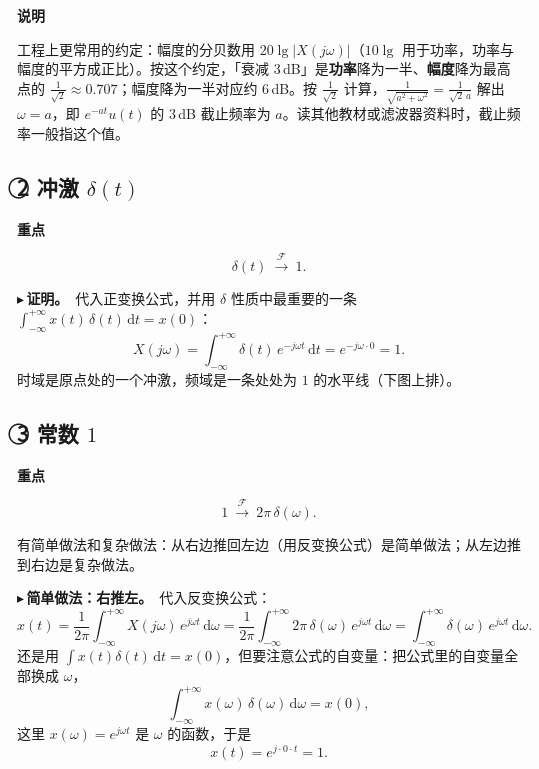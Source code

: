 \documentclass[UTF8,a4paper,11pt]{ctexart}
\newcommand{\dd}{\mathrm{d}}
\newcommand{\F}{\mathcal{F}}
\newenvironment{remember}{\begin{rememberbox}\textbf{重点}\par\smallskip}{\end{rememberbox}}
\newenvironment{note}{\begin{notebox}\textbf{说明}\par\smallskip}{\end{notebox}}
\newcounter{ex}[section]
\newcommand{\point}[1]{\par\addvspace{1ex}\noindent\textcolor{ptteal}{$\blacktriangleright$\,\textbf{#1}}\ }
\begin{document}
\begin{note}
工程上更常用的约定：幅度的分贝数用 $20\lg|X(j\omega)|$（$10\lg$ 用于功率，功率与幅度的平方成正比）。按这个约定，「衰减 3\,dB」是\textbf{功率}降为一半、\textbf{幅度}降为最高点的 $\frac1{\sqrt2}\approx0.707$；幅度降为一半对应约 $6$\,dB。按 $\frac1{\sqrt2}$ 计算，$\frac1{\sqrt{a^2+\omega^2}}=\frac1{\sqrt2\,a}$ 解出 $\omega=a$，即 $e^{-at}u(t)$ 的 3\,dB 截止频率为 $a$。读其他教材或滤波器资料时，截止频率一般指这个值。
\end{note}

\subsection{\texorpdfstring{\textcircled{\scriptsize 2} 冲激 $\delta(t)$}{② 冲激 δ(t)}}\label{sub:delta}
\begin{remember}
\[
\delta(t)\ \xrightarrow{\ \F\ }\ 1 .
\]
\end{remember}
\point{证明。}代入正变换公式，并用 $\delta$ 性质中最重要的一条 $\displaystyle\int_{-\infty}^{+\infty}x(t)\,\delta(t)\,\dd t=x(0)$：
\[
X(j\omega)=\int_{-\infty}^{+\infty}\delta(t)\,e^{-j\omega t}\,\dd t=e^{-j\omega\cdot0}=1 .
\]
时域是原点处的一个冲激，频域是一条处处为 $1$ 的水平线（下图上排）。

\subsection{\texorpdfstring{\textcircled{\scriptsize 3} 常数 $1$}{③ 常数 1}}\label{sub:one}
\begin{remember}
\[
1\ \xrightarrow{\ \F\ }\ 2\pi\,\delta(\omega).
\]
\end{remember}
有简单做法和复杂做法：从右边推回左边（用反变换公式）是简单做法；从左边推到右边是复杂做法。

\point{简单做法：右推左。}代入反变换公式：
\[
x(t)=\frac1{2\pi}\int_{-\infty}^{+\infty}X(j\omega)\,e^{j\omega t}\,\dd\omega
=\frac1{2\pi}\int_{-\infty}^{+\infty}2\pi\,\delta(\omega)\,e^{j\omega t}\,\dd\omega
=\int_{-\infty}^{+\infty}\delta(\omega)\,e^{j\omega t}\,\dd\omega .
\]
还是用 $\int x(t)\delta(t)\,\dd t=x(0)$，但要注意公式的自变量：把公式里的自变量全部换成 $\omega$，
\[
\int_{-\infty}^{+\infty}x(\omega)\,\delta(\omega)\,\dd\omega=x(0),
\]
这里 $x(\omega)=e^{j\omega t}$ 是 $\omega$ 的函数，于是
\[
x(t)=e^{j\cdot0\cdot t}=1 .
\]
\end{document}
